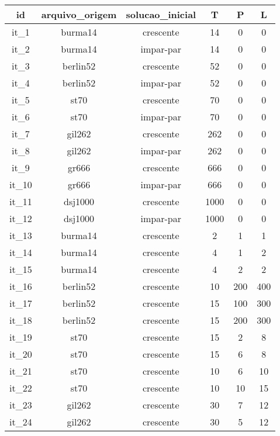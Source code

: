 \begin{table}[H]
    \centering
    {\begin{tabular}{cccccc}
        \hline
        id & arquivo\_origem & solucao\_inicial & T & P & L \\
        \hline
        it\_1 & burma14 & crescente & 14 & 0 & 0 \\
        it\_2 & burma14 & impar-par & 14 & 0 & 0 \\
        it\_3 & berlin52 & crescente & 52 & 0 & 0 \\
        it\_4 & berlin52 & impar-par & 52 & 0 & 0 \\
        it\_5 & st70 & crescente & 70 & 0 & 0 \\
        it\_6 & st70 & impar-par & 70 & 0 & 0 \\
        it\_7 & gil262 & crescente & 262 & 0 & 0 \\
        it\_8 & gil262 & impar-par & 262 & 0 & 0 \\
        it\_9 & gr666 & crescente & 666 & 0 & 0 \\
        it\_10 & gr666 & impar-par & 666 & 0 & 0 \\
        it\_11 & dsj1000 & crescente & 1000 & 0 & 0 \\
        it\_12 & dsj1000 & impar-par & 1000 & 0 & 0 \\
        it\_13 & burma14 & crescente & 2 & 1 & 1 \\
        it\_14 & burma14 & crescente & 4 & 1 & 2 \\
        it\_15 & burma14 & crescente & 4 & 2 & 2 \\
        it\_16 & berlin52 & crescente & 10 & 200 & 400 \\
        it\_17 & berlin52 & crescente & 15 & 100 & 300 \\
        it\_18 & berlin52 & crescente & 15 & 200 & 300 \\
        it\_19 & st70 & crescente & 15 & 2 & 8 \\
        it\_20 & st70 & crescente & 15 & 6 & 8 \\
        it\_21 & st70 & crescente & 10 & 6 & 10 \\
        it\_22 & st70 & crescente & 10 & 10 & 15 \\
        it\_23 & gil262 & crescente & 30 & 7 & 12 \\
        it\_24 & gil262 & crescente & 30 & 5 & 12 \\
        \hline
    \end{tabular}}
    \caption{}
    \label{}
\end{table}
